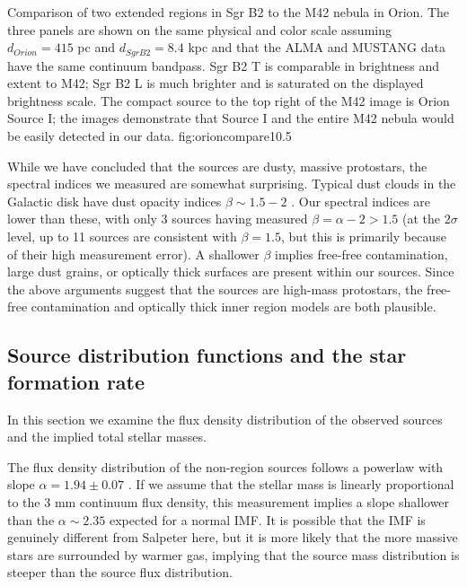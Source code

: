 \documentclass[twocolumn]{aastex61}
\begin{document}
{Comparison of two extended \hii regions in Sgr B2 to the M42 nebula in Orion.
The three panels are shown on the same physical and color scale assuming
$d_{Orion} = 415$ pc and $d_{Sgr B2} = 8.4$ kpc and that the ALMA and MUSTANG
data have the same continuum bandpass.  Sgr B2 \hii T is comparable in
brightness and extent to M42; Sgr B2 \hii L is much brighter and is saturated
on the displayed brightness scale.  The compact source to the top right of the
M42 image is Orion Source I; the images demonstrate that Source I and the entire
M42 nebula would be easily detected in our data.
}
{fig:orioncompare}{1}{0.5\textwidth}

While we have concluded that the sources are dusty, massive protostars, the
spectral indices we measured are somewhat surprising.  Typical dust clouds in
the Galactic disk have dust opacity indices $\beta\sim1.5-2$
\citep{Schnee2010a,Shirley2011a,Sadavoy2016a}.  Our spectral indices are lower
than these, with only 3 sources having measured $\beta=\alpha-2 > 1.5$ (at the
$2\sigma$ level, up to 11 sources are consistent with $\beta=1.5$, but this is
primarily because of their high measurement error).  A shallower $\beta$
implies free-free contamination, large dust grains, or optically thick surfaces
are present within our sources.  Since the above arguments suggest that the
sources are high-mass protostars, the free-free contamination and optically
thick inner region models are both plausible.

\subsection{Source distribution functions and the star formation rate}
\label{sec:distributionsandsfr}

In this section we examine the flux density distribution of the observed
sources and the implied total stellar masses.  

The flux density distribution of the non-\hii region sources follows a powerlaw
with slope $\alpha=1.94\pm0.07$ \citep[fitted with the MLE method
of][]{Clauset2007a}.  If we assume that the stellar mass is linearly
proportional to the 3 mm continuum flux density, this measurement implies a
slope shallower than the $\alpha\sim2.35$ expected for a normal IMF.  It is
possible that the IMF is genuinely different from Salpeter here, but it is more
likely that the more massive stars are surrounded by warmer gas, implying that
the source mass distribution is steeper than the source flux distribution.
\end{document}
